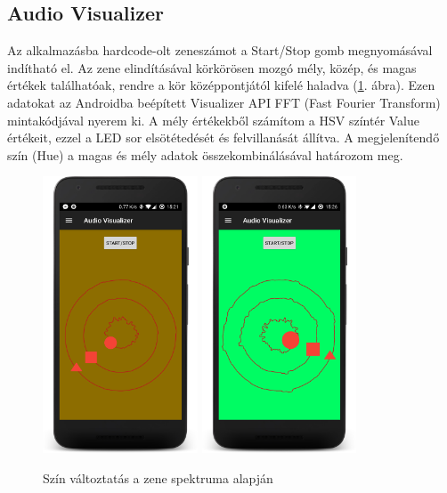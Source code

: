 \documentclass[../main.tex]{subfiles}
\begin{document}
        \subsection{Audio Visualizer}
            Az alkalmazásba hardcode-olt zeneszámot a Start/Stop gomb megnyomásával indítható el. Az zene elindításával körkörösen mozgó mély, közép, és magas értékek találhatóak, rendre a kör középpontjától kifelé haladva (\ref{fig:audio_visualizer}. ábra). Ezen adatokat az Androidba beépített Visualizer API FFT (Fast Fourier Transform) mintakódjával nyerem ki. A mély értékekből számítom a HSV színtér Value értékeit, ezzel a LED sor elsötétedését és felvillanását állítva. A megjelenítendő szín (Hue) a magas és mély adatok összekombinálásával határozom meg. 
            \begin{figure}[h!]
                \centering
                    \includegraphics[width=4.6cm]{android_res/screen_pictures/audio_vis_01}
                    \includegraphics[width=4.6cm]{android_res/screen_pictures/audio_vis_02}
                \caption{Szín változtatás a zene spektruma alapján}
                \label{fig:audio_visualizer}
            \end{figure}
\end{document}
